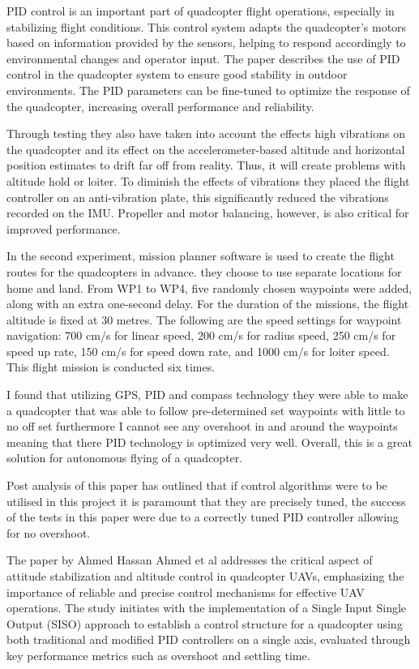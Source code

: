 \documentclass{report}
\begin{document}
PID control is an important part of quadcopter flight operations, especially in
stabilizing flight conditions. This control system adapts the quadcopter's
motors based on information provided by the sensors, helping to respond
accordingly to environmental changes and operator input. The paper describes the
use of PID control in the quadcopter system to ensure good stability in outdoor
environments. The PID parameters can be fine-tuned to optimize the response of
the quadcopter, increasing overall performance and reliability.

Through testing they also have taken into account the effects high vibrations on
the quadcopter and its effect on the accelerometer-based altitude and horizontal
position estimates to drift far off from reality. Thus, it will create problems
with altitude hold or loiter. To diminish the effects of vibrations they placed
the flight controller on an anti-vibration plate, this significantly reduced the
vibrations recorded on the IMU. Propeller and motor balancing, however, is also
critical for improved performance.

In the second experiment, mission planner software is used to create the flight
routes for the quadcopters in advance. they choose to use separate locations for
home and land. From WP1 to WP4, five randomly chosen waypoints were added, along
with an extra one-second delay. For the duration of the missions, the flight
altitude is fixed at 30 metres. The following are the speed settings for
waypoint navigation: 700 cm/s for linear speed, 200 cm/s for radius speed, 250
cm/s for speed up rate, 150 cm/s for speed down rate, and 1000 cm/s for loiter
speed. This flight mission is conducted six times.

I found that utilizing GPS, PID and compass technology they were able to make a
quadcopter that was able to follow pre-determined set waypoints with little to
no off set furthermore I cannot see any overshoot in and around the waypoints
meaning that there PID technology is optimized very well. Overall, this is a
great solution for autonomous flying of a quadcopter.

Post analysis of this paper has outlined that if control algorithms were to be
utilised in this project it is paramount that they are precisely tuned, the
success of the tests in this paper were due to a correctly tuned PID controller
allowing for no overshoot. 

The paper by Ahmed Hassan Ahmed et al \cite{AhmedHassan2016} addresses the
critical aspect of attitude stabilization and altitude control in quadcopter
UAVs, emphasizing the importance of reliable and precise control mechanisms for
effective UAV operations. The study initiates with the implementation of a
Single Input Single Output (SISO) approach to establish a control structure for
a quadcopter using both traditional and modified PID controllers on a single
axis, evaluated through key performance metrics such as overshoot and settling
time.
\end{document}
